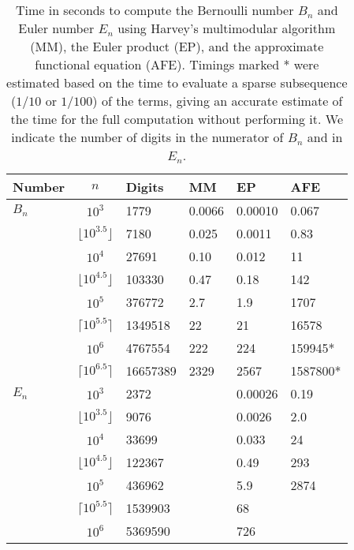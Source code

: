 \documentclass[reqno]{amsart}
\theoremstyle{definition}
\begin{document}
\begin{table}%
\setlength{\tabcolsep}{10pt}
\renewcommand{\arraystretch}{1.08}
\centering
\caption{\small
Time in seconds to compute the Bernoulli number $B_n$ and Euler number $E_n$ using Harvey's multimodular algorithm (MM), the Euler product (EP), and the approximate
functional equation (AFE). Timings marked * were estimated
based on the time to evaluate a sparse subsequence ($1/10$ or $1/100$) of the terms,
giving an accurate estimate of the time for the full computation without performing it. We indicate the number of digits in
the numerator of $B_n$ and in $E_n$.}
\label{tab:timebernoulli}
\small
\begin{tabular}{l c l l l l}
Number   & $n$                           & Digits & MM       & EP            & AFE \\ \hline
$B_n$    &  $10^3$                       & 1779          & 0.0066   & 0.00010       & 0.067    \\
         &  $\lfloor 10^{3.5} \rfloor$   & 7180          & 0.025    & 0.0011        & 0.83     \\
         &  $10^4$                       & 27691        & 0.10     & 0.012         & 11       \\
         &  $\lfloor 10^{4.5} \rfloor$   & 103330        & 0.47     & 0.18          & 142      \\
         &  $10^{5}$                     & 376772       & 2.7      & 1.9           & 1707     \\
         &  $\lceil 10^{5.5} \rceil$     & 1349518       & 22       & 21            & 16578    \\
         &  $10^{6}$                     & 4767554                & 222      & 224           & 159945*  \\
         &  $\lceil 10^{6.5} \rceil$     & 16657389                & 2329     & 2567          & 1587800* \\ \hline
$E_n$    &  $10^3$                       & 2372       &          & 0.00026       & 0.19     \\
         &  $\lfloor 10^{3.5} \rfloor$   & 9076       &          & 0.0026        & 2.0      \\
         &  $10^4$                       & 33699       &          & 0.033         & 24       \\
         &  $\lfloor 10^{4.5} \rfloor$   & 122367       &          & 0.49          & 293      \\
         &  $10^{5}$                     & 436962       &          & 5.9           & 2874     \\
         &  $\lceil 10^{5.5} \rceil$     & 1539903       &          & 68            &          \\
         &  $10^{6}$                     & 5369590  &          & 726           &          \\
\end{tabular}
\end{table}
\end{document}
